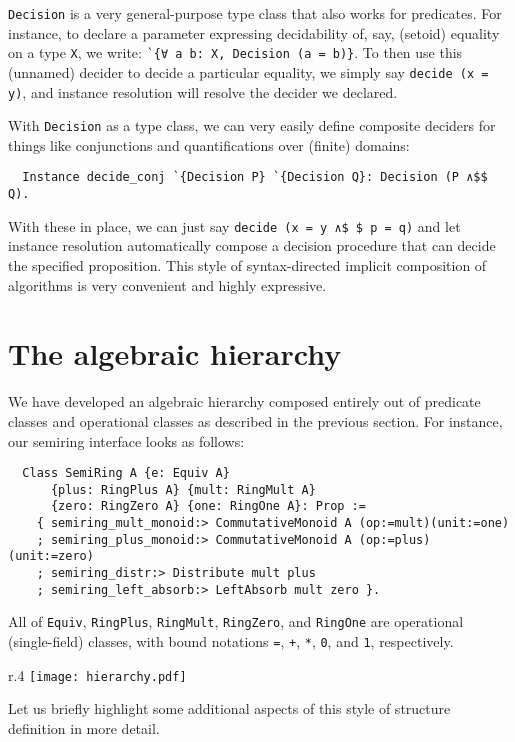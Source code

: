 \documentclass[a4paper,10pt,runningheads]{llncs}
\begin{document}
\lstinline|Decision| is a very general-purpose type class that also works for predicates. For instance, to declare a parameter expressing decidability of, say, (setoid) equality on a type \lstinline|X|, we write: \lstinline|`{∀ a b: X, Decision (a = b)}|. To then use this (unnamed) decider to decide a particular equality, we simply say \lstinline|decide (x = y)|, and instance resolution will resolve the decider we declared.

With \lstinline|Decision| as a type class, we can very easily define composite deciders for things like conjunctions and quantifications over (finite) domains:
\begin{lstlisting}
  Instance decide_conj `{Decision P} `{Decision Q}: Decision (P ∧$$ Q).
\end{lstlisting}
With these in place, we can just say \lstinline|decide (x = y ∧$ $ p = q)| and let instance resolution automatically compose a decision procedure that can decide the specified proposition. This style of syntax-directed implicit composition of algorithms is very convenient and highly expressive.

\section{The algebraic hierarchy}\label{classes}

We have developed an algebraic hierarchy composed entirely out of predicate classes and operational classes as described in the previous section. For instance, our semiring interface looks as follows:
\begin{lstlisting}
  Class SemiRing A {e: Equiv A}
      {plus: RingPlus A} {mult: RingMult A}
      {zero: RingZero A} {one: RingOne A}: Prop :=
    { semiring_mult_monoid:> CommutativeMonoid A (op:=mult)(unit:=one)
    ; semiring_plus_monoid:> CommutativeMonoid A (op:=plus)(unit:=zero)
    ; semiring_distr:> Distribute mult plus
    ; semiring_left_absorb:> LeftAbsorb mult zero }.
\end{lstlisting}

All of \lstinline|Equiv|, \lstinline|RingPlus|, \lstinline|RingMult|, \lstinline|RingZero|, and \lstinline|RingOne| are operational (single-field) classes, with bound notations \lstinline|=|, \lstinline|+|, \lstinline|*|, \lstinline|0|, and \lstinline|1|, respectively.
\begin{wrapfigure}{r}{.4\textwidth}
    \texttt{[image: hierarchy.pdf]}
\end{wrapfigure}
Let us briefly highlight some additional aspects of this style of structure definition in more detail.
\end{document}
